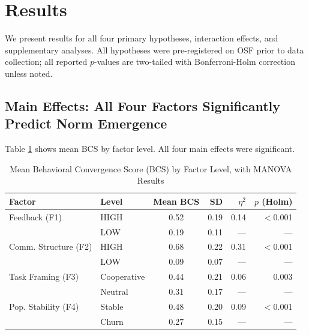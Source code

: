 \section{Results}
\label{sec:results}

We present results for all four primary hypotheses, interaction effects, and supplementary analyses. All hypotheses were pre-registered on OSF prior to data collection; all reported $p$-values are two-tailed with Bonferroni-Holm correction unless noted.

\subsection{Main Effects: All Four Factors Significantly Predict Norm Emergence}
\label{sec:main-effects}

Table \ref{tab:main-effects} shows mean BCS by factor level. All four main effects were significant.

\begin{table}[t]
\caption{Mean Behavioral Convergence Score (BCS) by Factor Level, with MANOVA Results}
\label{tab:main-effects}
\vskip 0.12in
\begin{center}
\begin{small}
\begin{tabular}{llcrrr}
\hline
\textbf{Factor} & \textbf{Level} & \textbf{Mean BCS} & \textbf{SD} & \textbf{$\eta^2$} & \textbf{$p$ (Holm)} \\
\hline
Feedback (F1) & HIGH & 0.52 & 0.19 & 0.14 & $<$0.001 \\
              & LOW  & 0.19 & 0.11 & —    & —              \\
\hline
Comm. Structure (F2) & HIGH & 0.68 & 0.22 & 0.31 & $<$0.001 \\
                      & LOW  & 0.09 & 0.07 & —    & —              \\
\hline
Task Framing (F3) & Cooperative & 0.44 & 0.21 & 0.06 & 0.003 \\
                  & Neutral     & 0.31 & 0.17 & —    & —              \\
\hline
Pop. Stability (F4) & Stable & 0.48 & 0.20 & 0.09 & $<$0.001 \\
                     & Churn  & 0.27 & 0.15 & —    & —              \\
\hline
\end{tabular}
\end{small}
\end{center}
\vskip -0.1in
\end{table}

